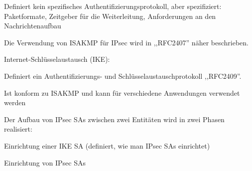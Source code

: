 \documentclass[a4paper]{article}
\begin{document}
\begin{multicols}{3}
\begin{itemize*}
\begin{itemize*}
\begin{itemize*}
                        \item Definiert kein spezifisches Authentifizierungsprotokoll, aber spezifiziert: Paketformate, Zeitgeber für die Weiterleitung, Anforderungen an den Nachrichtenaufbau
                        \item Die Verwendung von ISAKMP für IPsec wird in ,,RFC2407'' näher beschrieben.
                  \end{itemize*}
                  \item Internet-Schlüsselaustausch (IKE):
                  \begin{itemize*}
                        \item Definiert ein Authentifizierungs- und Schlüsselaustauschprotokoll ,,RFC2409''.
                        \item Ist konform zu ISAKMP und kann für verschiedene Anwendungen verwendet werden
                        \item Der Aufbau von IPsec SAs zwischen zwei Entitäten wird in zwei Phasen realisiert:
                        \item Einrichtung einer IKE SA (definiert, wie man IPsec SAs einrichtet)
                        \item Einrichtung von IPsec SAs
                  \end{itemize*}
            \end{itemize*}
      \end{itemize*}


\end{multicols}
\end{document}
